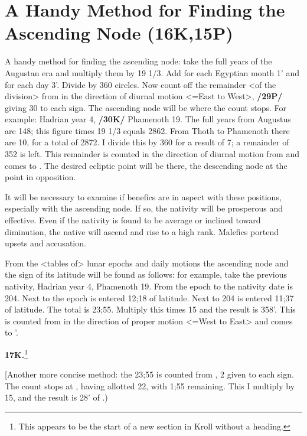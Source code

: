 \section{A Handy Method for Finding the Ascending Node (16K,15P)}

A handy method for finding the ascending node: take the full years of the Augustan era and multiply them by 19 1/3. Add for each Egyptian month 1\deg\xspace 35' and for each day 3'. Divide by 360\deg\xspace circles. Now count off the remainder <of the division> from \Cancer\xspace in the direction of diurnal motion <=East to West>, \textbf{/29P/} giving 30 to each sign. The ascending node will be where the count stops. For example: Hadrian year 4, \textbf{/30K/} Phamenoth 19. The full years from Augustus are 148; this figure times 19 1/3 equals 2862. From Thoth to Phamenoth there are 10\deg, for a total of 2872. I divide this by 360\deg\xspace for a result of 7; a remainder of 352 is left. This remainder is counted in the direction of diurnal motion from \Cancer\xspace and comes to \deg. The desired ecliptic point will be there, the descending node at the point in opposition.

\mndl[0.2cm]
It will be necessary to examine if benefics are in aspect with these positions, especially with the ascending node. If so, the nativity will be prosperous and effective. Even if the nativity is found to be average or inclined toward diminution, the native will ascend and rise to a high rank. Malefics portend
upsets and accusation.

From the <tables of> lunar epochs and daily motions the ascending node and the sign of its latitude will be found as follows: for example, take the previous nativity, Hadrian year 4, Phamenoth 19. From the epoch to the nativity date is 204. Next to the epoch is entered 12;18 of latitude. Next to 204 is entered 11;37 of latitude. The total is 23;55. Multiply this times 15\deg\xspace and the result is 358\deg\xspace 45'. This is counted from \Leo\xspace in the direction of proper motion <=West to East> and comes to \Cancer\xspace 28\deg\xspace 45'.

\textbf{17K.}\footnote{This appears to be the start of a new section in Kroll without a heading.}
\setcounter{section}{17}

[Another more concise method: the 23;55 is counted from \Leo, 2 given to each sign. The count stops at \Gemini, having allotted 22, with 1;55 remaining. This I multiply by 15\deg, and the result is 28\deg\xspace 45' of \Cancer.)

